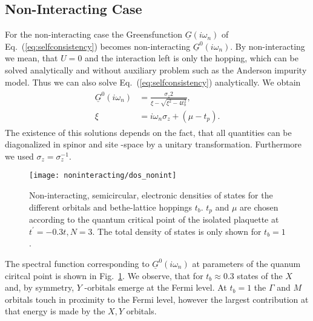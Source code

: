 \documentclass[aps,prb,twocolumn,groupedaddress,amsmath,amssymb]{revtex4-1}
\newcommand{\refeq}[1]{Eq.~(\ref{#1})}
\newcommand{\reffig}[1]{Fig.~\ref{#1}}
\newcommand{\Nambu}[1]{\underline{#1}}
\begin{document}
\subsection{Non-Interacting Case}
For the non-interacting case the Greensfunction $\Nambu{G}(i\omega_n)$ of \refeq{eq:selfconsistency} becomes non-interacting $\Nambu{G}^0(i\omega_n)$. By non-interacting we mean, that $U=0$ and the interaction left is only the hopping, which can be solved analytically and without auxiliary problem such as the Anderson impurity model. Thus we can also solve \refeq{eq:selfconsistency} analytically. We obtain
\begin{align}
  \label{eq:uzero}
  \begin{split}
    \Nambu{G}^0(i\omega_n)&=\frac{\sigma_z 2}{\xi-\sqrt{\xi^2 - 4t^2_b}},\\
    \xi&=i\omega_n\sigma_z+\left(\mu - t_p\right).
  \end{split}
\end{align}
The existence of this solutions depends on the fact, that all quantities can be diagonalized in spinor and site -space by a unitary transformation. Furthermore we used $\sigma_z = \sigma^{-1}_z$.
\begin{figure}[th]
  \texttt{[image: noninteracting/dos\_nonint]}
  \caption{Non-interacting, semicircular, electronic densities of states for the different orbitals and bethe-lattice hoppings $t_b$. $t_p$ and $\mu$ are chosen according to the quantum critical point of the isolated plaquette at $t^\prime=-0.3t, N=3$. The total density of states is only shown for $t_b=1$.}
  \label{fig:nonint}
\end{figure}
The spectral function corresponding to $\Nambu{G}^0(i\omega_n)$ at parameters of the quanum ciritcal point is shown in \reffig{fig:nonint}. We observe, that for $t_b\approx 0.3$ states of the $X$ and, by symmetry, $Y$ -orbitals emerge at the Fermi level. At $t_b=1$ the $\Gamma$ and $M$ orbitals touch in proximity to the Fermi level, however the largest contribution at that energy is made by the $X,Y$ orbitals.
\end{document}
